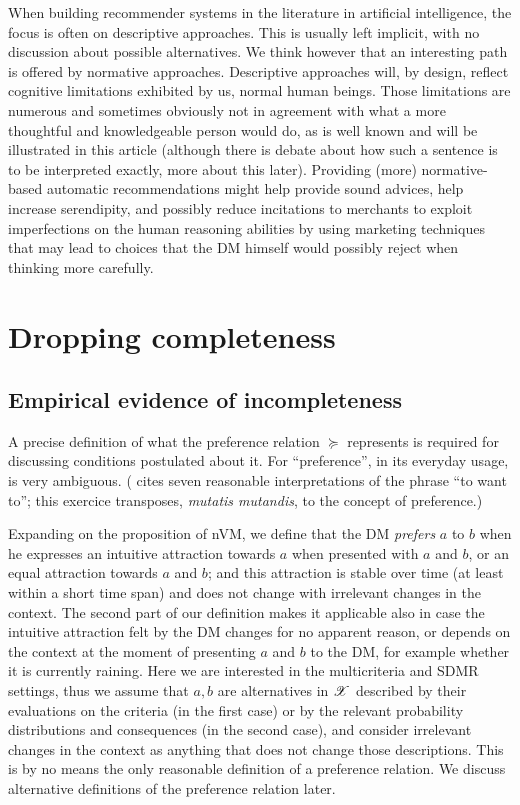 \documentclass[french, english]{llncs}
\begin{document}
	When building recommender systems in the literature in artificial intelligence, the focus is often on descriptive approaches. This is usually left implicit, with no discussion about possible alternatives. We think however that an interesting path is offered by normative approaches. Descriptive approaches will, by design, reflect cognitive limitations exhibited by us, normal human beings. Those limitations are numerous and sometimes obviously not in agreement with what a more thoughtful and knowledgeable person would do, as is well known and will be illustrated in this article (although there is debate about how such a sentence is to be interpreted exactly, more about this later). Providing (more) normative-based automatic recommendations might help provide sound advices, help increase serendipity, and possibly reduce incitations to merchants to exploit imperfections on the human reasoning abilities by using marketing techniques that may lead to choices that the \ac{DM} himself would possibly reject when thinking more carefully.
	
	\section{Dropping completeness}
	
	\subsection{Empirical evidence of incompleteness}
	A precise definition of what the preference relation $\succeq$ represents is required for discussing conditions postulated about it. For “preference”, in its everyday usage, is very ambiguous. (\citet{frankfurt_freedom_1971} cites seven reasonable interpretations of the phrase “to want to”; this exercice transposes, \emph{mutatis mutandis}, to the concept of preference.)
	
	Expanding on the proposition of nVM, we define that the \ac{DM} \emph{prefers} $a$ to $b$ when he expresses an intuitive attraction towards $a$ when presented with $a$ and $b$, or an equal attraction towards $a$ and $b$; and this attraction is stable over time (at least within a short time span) and does not change with irrelevant changes in the context. The second part of our definition makes it applicable also in case the intuitive attraction felt by the \ac{DM} changes for no apparent reason, or depends on the context at the moment of presenting $a$ and $b$ to the \ac{DM}, for example whether it is currently raining. Here we are interested in the multicriteria and SDMR settings, thus we assume that $a, b$ are alternatives in $\mathscr{X}$ described by their evaluations on the criteria (in the first case) or by the relevant probability distributions and consequences (in the second case), and consider irrelevant changes in the context as anything that does not change those descriptions. 
	This is by no means the only reasonable definition of a preference relation. We discuss alternative definitions of the preference relation later.
	
\end{document}
